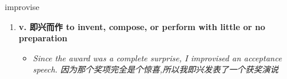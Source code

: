 
\begin{frame}
{\huge improvise}
\begin{center}
\begin{enumerate}\Large
  \item \textbf{v. 即兴而作 to invent, compose, or perform with little or no preparation}
  \begin{itemize}
    \item \em{\Large{Since the award was a complete surprise, I improvised an acceptance speech. 因为那个奖项完全是个惊喜,所以我即兴发表了一个获奖演说}}
  \end{itemize}
\end{enumerate}
\end{center}
\end{frame}
